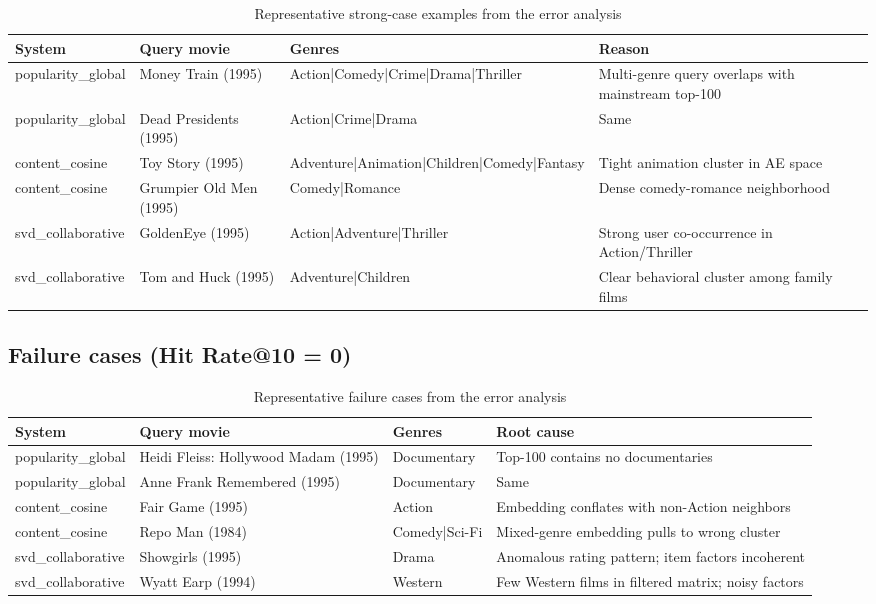 \documentclass[12pt,a4paper]{article}
\begin{document}
\begin{table}[H]
\centering
\caption{Representative strong-case examples from the error analysis}
\begin{tabular}{p{3.2cm}p{4.8cm}p{3cm}p{3.5cm}}
\toprule
\textbf{System} & \textbf{Query movie} & \textbf{Genres} & \textbf{Reason} \\
\midrule
popularity\_global & Money Train (1995) & Action|Comedy|Crime|Drama|Thriller & Multi-genre query overlaps with mainstream top-100 \\
popularity\_global & Dead Presidents (1995) & Action|Crime|Drama & Same \\
content\_cosine & Toy Story (1995) & Adventure|Animation|Children|Comedy|Fantasy & Tight animation cluster in AE space \\
content\_cosine & Grumpier Old Men (1995) & Comedy|Romance & Dense comedy-romance neighborhood \\
svd\_collaborative & GoldenEye (1995) & Action|Adventure|Thriller & Strong user co-occurrence in Action/Thriller \\
svd\_collaborative & Tom and Huck (1995) & Adventure|Children & Clear behavioral cluster among family films \\
\bottomrule
\end{tabular}
\end{table}

\subsection{Failure cases (Hit Rate@10 = 0)}
\label{subsec:failures}

\begin{table}[H]
\centering
\caption{Representative failure cases from the error analysis}
\begin{tabular}{p{3.2cm}p{5cm}p{2.2cm}p{3.5cm}}
\toprule
\textbf{System} & \textbf{Query movie} & \textbf{Genres} & \textbf{Root cause} \\
\midrule
popularity\_global & Heidi Fleiss: Hollywood Madam (1995) & Documentary & Top-100 contains no documentaries \\
popularity\_global & Anne Frank Remembered (1995) & Documentary & Same \\
content\_cosine & Fair Game (1995) & Action & Embedding conflates with non-Action neighbors \\
content\_cosine & Repo Man (1984) & Comedy|Sci-Fi & Mixed-genre embedding pulls to wrong cluster \\
svd\_collaborative & Showgirls (1995) & Drama & Anomalous rating pattern; item factors incoherent \\
svd\_collaborative & Wyatt Earp (1994) & Western & Few Western films in filtered matrix; noisy factors \\
\bottomrule
\end{tabular}
\end{table}
\end{document}
